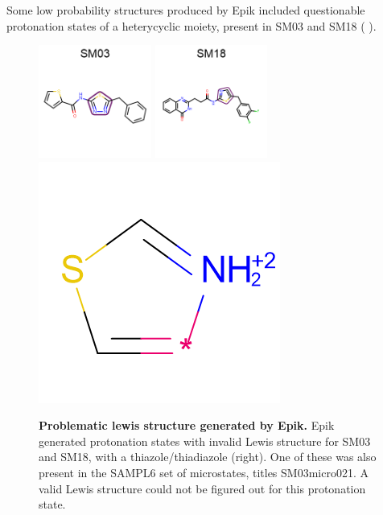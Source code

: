 \documentclass[9pt,lineno]{elife}
\begin{document}
Some low probability structures produced by Epik included questionable protonation states of a heterycyclic moiety, present in SM03 and SM18 ( ). 

\begin{figure}[H]
    \centering
    \includegraphics[width=0.33\textwidth]{Images/Molecules/SM03-smarts.png}
    \includegraphics[width=0.33\textwidth]{Images/Molecules/SM18-smarts.png}
    \includegraphics[scale=0.33]{Images/Molecules/lewis-problem.png}
    \caption{{\bf Problematic lewis structure generated by Epik.}
    Epik generated protonation states with invalid Lewis structure for SM03 and SM18, with a thiazole/thiadiazole (right). One of these was also present in the SAMPL6 set of microstates, titles SM03\textunderscore{}micro021. A valid Lewis structure could not be figured out for this protonation state.}
    \label{fig:lewis-structure-SM03-SM18}
\end{figure}
\end{document}
